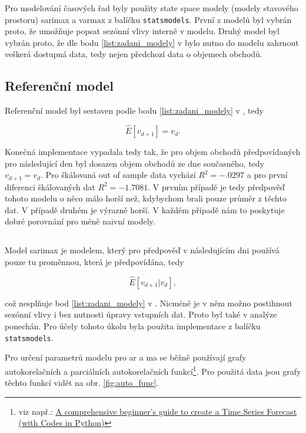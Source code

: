\documentclass[a4paper,12pt, czech]{article}
\newcommand{\code}[1]{\texttt{#1}}
\begin{document}
Pro modelování časových řad byly použity state space modely (modely stavového prostoru) \gls{sarimax} a \gls{varmax} z balíčku \code{statsmodels}.
První z modelů byl vybrán proto, že umožňuje popsat sezónní vlivy interně v modelu.
Druhý model byl vybrán proto, že dle bodu \ref{list:zadani_modely} v  bylo nutno do modelu zahrnout veškerá dostupná data, tedy nejen předchozí data o objemech obchodů.

\subsection{Referenční model}

Referenční model byl sestaven podle bodu \ref{list:zadani_modely} v , tedy

\begin{equation}\label{eq:reference}
\hat{E}\left[v_{d+1}\right] = v_d.
\end{equation}

Konečná implementace vypadala tedy tak, že pro objem obchodů předpovídaných pro následující den byl dosazen objem obchodů ze dne současného, tedy $v_{d+1} = v_d$.
Pro škálovaná out of sample data vychází $R^2=\num{-.0297}$ a pro první diferenci škálovaných dat $R^2=\num{-1.7081}$.
V prvním případě je tedy předpověď tohoto modelu o něco málo horší než, kdybychom brali pouze průměr z těchto dat.
V případě druhém je výrazně horší.
V každém případě nám to poskytuje dobré porovnání pro méně naivní modely.

\subsection{} \label{sec:sarimax}

Model \gls{sarimax} je modelem, který pro předpověď v následujícím dni používá pouze tu proměnnou, která je předpovídána, tedy 

\begin{equation}\label{eq:sarimax}
\hat{E}\left[v_{d+1}|v_d\right],
\end{equation}

což nesplňuje bod \ref{list:zadani_modely} v .
Nicméně je v něm možno postihnout sezónní vlivy i bez nutnosti úpravy vstupních dat.
Proto byl také v analýze ponechán.
Pro účely tohoto úkolu byla použita implementace z balíčku \code{statsmodels}.

Pro určení parametrů modelu pro \gls{ar} a \gls{ma} se běžně používají grafy autokorelačních a parciálních autokorelačních funkcí\footnote{viz např.: \href{https://www.analyticsvidhya.com/blog/2016/02/time-series-forecasting-codes-python/}{A comprehensive beginner’s guide to create a Time Series Forecast (with Codes in Python)}}.
Pro použitá data jsou grafy těchto funkcí vidět na obr. \ref{fig:auto_func}.
\end{document}
